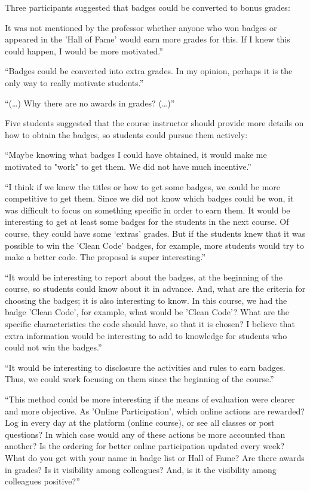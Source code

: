 Three participants suggested that badges could be converted to bonus grades:

It was not mentioned by the professor whether anyone who won badges or appeared in the 'Hall of Fame' would earn more grades for this. If I knew this could happen, I would be more motivated.”

“Badges could be converted into extra grades. In my opinion, perhaps it is the only way to really motivate students.”

“(…) Why there are no awards in grades? (…)”

Five students suggested that the course instructor should provide more details on how to obtain the badges, so students could pursue them actively:

“Maybe knowing what badges I could have obtained, it would make me motivated to "work" to get them. We did not have much incentive.”

 “I think if we knew the titles or how to get some badges, we could be more competitive to get them. Since we did not know which badges could be won, it was difficult to focus on something specific in order to earn them. It would be interesting to get at least some badges for the students in the next course. Of course, they could have some ‘extras’ grades. But if the students knew that it was possible to win the 'Clean Code' badges, for example, more students would try to make a better code. The proposal is super interesting.”

“It would be interesting to report about the badges, at the beginning of the course, so students could know about it in advance. And, what are the criteria for choosing the badges; it is also interesting to know. In this course, we had the badge 'Clean Code', for example, what would be 'Clean Code'? What are the specific characteristics the code should have, so that it is chosen? I believe that extra information would be interesting to add to knowledge for students who could not win the badges.”

“It would be interesting to disclosure the activities and rules to earn badges. Thus, we could work focusing on them since the beginning of the course.”

 “This method could be more interesting if the means of evaluation were clearer and more objective. As 'Online Participation', which online actions are rewarded? Log in every day at the platform (online course), or see all classes or post questions? In which case would any of these actions be more accounted than another? Is the ordering for better online participation updated every week? What do you get with your name in badge list or Hall of Fame? Are there awards in grades? Is it visibility among colleagues? And, is it the visibility among colleagues positive?”

